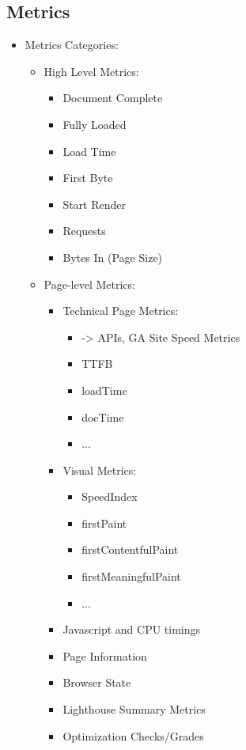 
\subsection{Metrics}


\begin{itemize}
\item Metrics Categories:
	\begin{itemize}
	\item High Level Metrics:
		\begin{itemize}
		\item Document Complete
		\item Fully Loaded
		\item Load Time
		\item First Byte
		\item Start Render
		\item Requests
		\item Bytes In (Page Size)
		\end{itemize}
	\item Page-level Metrics:
		\begin{itemize}
		\item Technical Page Metrics:
			\begin{itemize}
			\item -> APIs, GA Site Speed Metrics
			\item TTFB
			\item loadTime
			\item docTime
			\item ...
			\end{itemize}
		\item Visual Metrics:
			\begin{itemize}
			\item SpeedIndex
			\item firstPaint
			\item firstContentfulPaint
			\item firstMeaningfulPaint
			\item ...
			\end{itemize}
		\item Javascript and CPU timings
		\item Page Information
		\item Browser State
		\item Lighthouse Summary Metrics
		\item Optimization Checks/Grades

\end{itemize}
\end{itemize}
\end{itemize}
